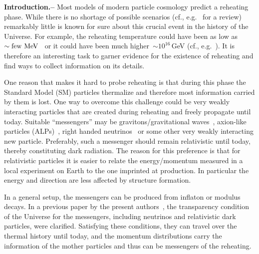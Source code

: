 \documentclass[superscriptaddress,aps,preprintnumbers,amsmath,showpacs,amssymb,prd,nofootinbib,reprint]{revtex4-1}
\begin{document}
{\bf Introduction.--}
Most models of modern particle cosmology predict a reheating phase.
While there is no shortage of possible scenarios (cf., e.g.~\cite{Bassett:2005xm} for a review)
remarkably little is known for sure about this crucial event in the history of the Universe. For example, the reheating temperature could have been as low as $\sim {\rm few} ~{\rm MeV}$~\cite{Kawasaki:1999na, Kawasaki:2000en,Hannestad:2004px,Ichikawa:2006vm,DeBernardis:2008zz,deSalas:2015glj,Hufnagel:2018bjp,Hasegawa:2019jsa,Kawasaki:2020qxm,Depta:2020zbh} or it could have been much higher~$\sim 10^{16}\,$GeV (cf., e.g.~\cite{Akrami:2018odb}).
It is therefore an interesting task to garner evidence for the existence of reheating and find ways to collect information on its details.

One reason that makes it hard to probe reheating is that during this phase the Standard Model (SM) particles thermalize and therefore most information carried by them is lost.  
One way to overcome this challenge could be very weakly interacting particles that are created during reheating
and freely propagate until today. Suitable ``messengers'' may be gravitons/gravitational waves~\cite{Tashiro:2003qp,Easther:2006gt,GarciaBellido:2007af,Dufaux:2007pt, Huang:2011gf,Hebecker:2016vbl,Amin:2018kkg,Adshead:2018doq,Kitajima:2018zco,Nakayama:2018ptw,Lozanov:2019ylm,Sang:2019ndv,Adshead:2019lbr,Adshead:2019igv, Domcke:2020xmn}, axion-like particles (ALPs)~\cite{Cicoli:2012aq,Higaki:2012ar,Conlon:2013isa,Hebecker:2014gka}, right handed neutrinos~\cite{Jaeckel:2020oet} or some other very weakly interacting new particle.
Preferably, such a messenger should remain relativistic until today, thereby constituting dark radiation. The reason for this preference is that for relativistic particles it is easier to relate the energy/momentum measured in a local experiment on Earth to the one imprinted at production. In particular the energy and direction are less affected by structure formation.

In a general setup, the messengers can be produced from inflaton or modulus decays.
In a previous paper by the present authors~\cite{Jaeckel:2020oet},  the transparency condition of the Universe for the messengers, including 
neutrinos and relativistic dark particles, were clarified. 
Satisfying these conditions, they can travel over the thermal history until today, and 
the momentum distributions carry the information of the mother particles and thus can be messengers of the reheating. 
\end{document}
